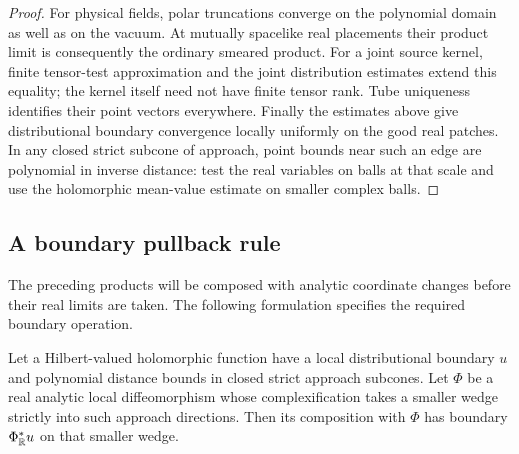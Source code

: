 \begin{proof}
For physical fields, polar truncations converge on the polynomial
domain as well as on the vacuum.  At mutually spacelike real
placements their product limit is consequently the ordinary smeared
product.  For a joint source kernel, finite tensor-test approximation
and the joint distribution estimates extend this equality; the
kernel itself need not have finite tensor rank.  Tube uniqueness
identifies their point vectors everywhere.
Finally the estimates above give distributional boundary convergence
locally uniformly on the good real patches.  In any closed strict
subcone of approach, point bounds near such an edge are polynomial
in inverse distance: test the real variables on balls at that scale
and use the holomorphic mean-value estimate on smaller complex balls.
\end{proof}

\subsection{A boundary pullback rule}

The preceding products will be composed with analytic coordinate
changes before their real limits are taken.  The following formulation
specifies the required boundary operation.

\begin{lemma}\label{E:boundary-calculus}
Let a Hilbert-valued holomorphic function have a local distributional
boundary $u$ and polynomial distance bounds in closed strict approach
subcones.  Let $\Phi$ be a real analytic local diffeomorphism whose
complexification takes a smaller wedge strictly into such approach
directions.  Then its composition with $\Phi$ has boundary
$\Phi_{\mathbb R}^{*}u$ on that smaller wedge.
\end{lemma}

